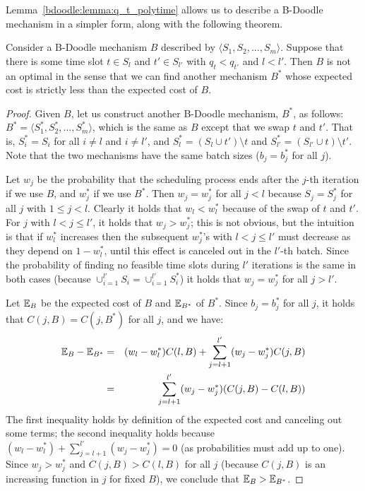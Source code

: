 Lemma~\ref{bdoodle:lemma:q_t_polytime} allows us to describe a B-Doodle mechanism in a simpler form, along with the following theorem. 
\begin{theorem} \label{bdoodle:thm:swap_argument}
Consider a B-Doodle mechanism $B$ described by $\langle S_1, S_2, \dots, S_m \rangle$. Suppose that there is some time slot $t \in S_l$ and $t'\in S_{l'}$ with $q_t < q_{t'}$ and $l < l'$. Then $B$ is not an optimal in the sense that we can find another mechanism $B^*$ whose expected cost is strictly less than the expected cost of $B$.
\end{theorem}
\begin{proof}
Given $B$, let us construct another B-Doodle mechanism, $B^*$, as follows: $B^* = \langle S^*_1, S^*_2, \dots, S^*_m \rangle$, which is the same as $B$ except that we swap $t$ and $t'$. That is, $S^*_i = S_i$ for all $i \neq l$ and $i\neq l'$, and $S^*_{l} = (S_l \cup t') \setminus t$ and $S^*_{l'} = (S_{l'} \cup t) \setminus t'$. Note that the two mechanisms have the same batch sizes ($b_j = b^*_j$ for all $j$). 

Let $w_j$ be the probability that the scheduling process ends after the $j$-th iteration if we use $B$, and $w_j^*$ if we use $B^*$. Then $w_j = w_j^*$ for all $j < l$ because $S_j = S^*_j$ for all $j$ with $1 \leq j < l$. Clearly it holds that $w_l < w_l^*$ because of the swap of $t$ and $t'$. For $j$ with $l < j \leq l'$, it holds that $w_j > w_j^*$; this is not obvious, but the intuition is that if $w_l^*$ increases then the subsequent $w_j^*$'s with $l < j \leq l'$ must decrease as they depend on $1-w_l^*$, until this effect is canceled out in the $l'$-th batch. Since the probability of finding no feasible time slots during $l'$ iterations is the same in both cases (because $\cup_{i=1}^{l'} S_i = \cup_{i=1}^{l'}S^*_i$) it holds that $w_j = w_j^*$ for all $j > l'$. 

Let $\mathbb{E}_B$ be the expected cost of $B$ and $\mathbb{E}_{B^*}$ of $B^*$. Since $b_j = b^*_j$ for all $j$, it holds that $C(j, B) = C(j, B^*)$ for all $j$, and we have:
\begin{eqnarray}
	\mathbb{E}_B - \mathbb{E}_{B^*} 
	&=& (w_l - w_l^*) C(l, B) + \sum_{j=l+1}^{l'} (w_j - w_j^*)C(j, B) \\
	&=& \sum_{j=l+1}^{l'} (w_j - w_j^*)(C(j, B) - C(l, B))
\end{eqnarray} 
The first inequality holds by definition of the expected cost and canceling out some terms; the second inequality holds because $(w_l - w_l^*) + \sum_{j=l+1}^{l'} (w_j - w_j^*) = 0$ (as probabilities must add up to one). Since $w_j > w_j^*$ and $C(j, B) > C(l, B)$ for all $j$ (because $C(j, B)$ is an increasing function in $j$ for fixed $B$), we conclude that $\mathbb{E}_{B} > \mathbb{E}_{B^*}$.
\end{proof}
